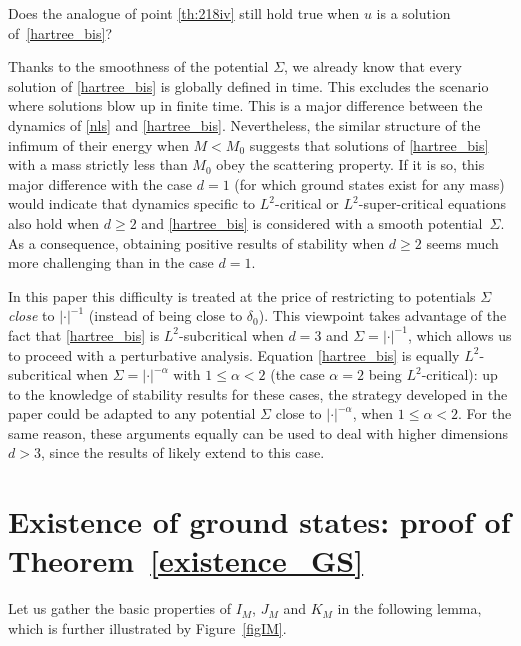 \begin{question}
Does the analogue of point \eqref{th:218iv} still hold true when $u$ is a solution of~\eqref{hartree_bis}?
\end{question}

Thanks to the smoothness of the potential $\Sigma$, we already know that every solution of \eqref{hartree_bis} is globally defined in time. This excludes the scenario where solutions blow up in finite time.
This is a major difference between the dynamics of \eqref{nls} and \eqref{hartree_bis}. Nevertheless,
the similar structure of the infimum of their energy when $M<M_{0}$ suggests that solutions of \eqref{hartree_bis} with a mass strictly less than $M_{0}$
obey the scattering property. If it is so, this major difference with the case $d=1$ (for which ground states exist for any mass) would indicate that dynamics specific to $L^{2}$-critical or $L^{2}$-super-critical equations also hold when $d\geq 2$ and \eqref{hartree_bis} is considered with a smooth potential~$\Sigma$. As a consequence, obtaining positive results of stability when $d\geq 2$ seems much more challenging than in the case $d=1$.

In this paper this difficulty is treated at the price of restricting to potentials $\Sigma$ \emph{close} to $|\cdot|^{-1}$
(instead of being close to $\delta_0$).
This viewpoint takes advantage
of the fact that \eqref{hartree_bis} is $L^{2}$-subcritical when $d=3$ and $\Sigma=|\cdot|^{-1}$, which allows us
to proceed with a perturbative analysis.
Equation \eqref{hartree_bis} is equally $L^{2}$-subcritical when $\Sigma=|\cdot|^{-\alpha}$ with $1\leq\alpha<2$ (the case $\alpha=2$ being $L^{2}$-critical): up to the knowledge of stability results for these cases, the strategy developed in the paper could be adapted to any potential $\Sigma$ close to $|\cdot|^{-\alpha}$, when $1\leq \alpha<2$.
For the same reason, these arguments equally can be used to deal with higher dimensions $d>3$,
since the results of \cite{Lenzmann} likely extend to this case.

\section{Existence of ground states: proof of Theorem~\ref{existence_GS}}\label{GroundStates}

Let us gather the basic properties of $I_{M}$, $J_{M}$ and $K_{M}$ in the following lemma, which is further illustrated by Figure~\ref{figIM}.

